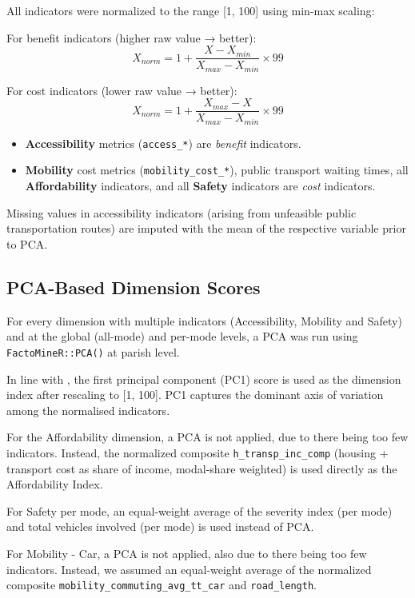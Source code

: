 \documentclass[
  authoryear,
  review,
  1p]{elsarticle}
\providecommand{\tightlist}{%
  \setlength{\itemsep}{0pt}\setlength{\parskip}{0pt}}
\begin{document}
All indicators were normalized to the range {[}1, 100{]} using min-max
scaling:

For benefit indicators (higher raw value → better):
\[X_{norm} = 1 + \frac{X - X_{min}}{X_{max} - X_{min}} \times 99\]

For cost indicators (lower raw value → better):
\[X_{norm} = 1 + \frac{X_{max} - X}{X_{max} - X_{min}} \times 99\]

\begin{itemize}
\tightlist
\item
  \textbf{Accessibility} metrics (\texttt{access\_*}) are \emph{benefit}
  indicators.
\item
  \textbf{Mobility} cost metrics (\texttt{mobility\_cost\_*}), public
  transport waiting times, all \textbf{Affordability} indicators, and
  all \textbf{Safety} indicators are \emph{cost} indicators.
\end{itemize}

Missing values in accessibility indicators (arising from unfeasible
public transportation routes) are imputed with the mean of the
respective variable prior to PCA.

\subsection{PCA-Based Dimension Scores}\label{sec-MET_pca}

For every dimension with multiple indicators (Accessibility, Mobility
and Safety) and at the global (all-mode) and per-mode levels, a PCA was
run using \texttt{FactoMineR::PCA()} at parish level.

In line with \citet{OECD_EU_2008}, the first principal component (PC1)
score is used as the dimension index after rescaling to {[}1, 100{]}.
PC1 captures the dominant axis of variation among the normalised
indicators.

For the Affordability dimension, a PCA is not applied, due to there
being too few indicators. Instead, the normalized composite
\texttt{h\_transp\_inc\_comp} (housing + transport cost as share of
income, modal-share weighted) is used directly as the Affordability
Index.

For Safety per mode, an equal-weight average of the severity index (per
mode) and total vehicles involved (per mode) is used instead of PCA.

For Mobility - Car, a PCA is not applied, also due to there being too
few indicators. Instead, we assumed an equal-weight average of the
normalized composite \texttt{mobility\_commuting\_avg\_tt\_car} and
\texttt{road\_length}.
\end{document}
